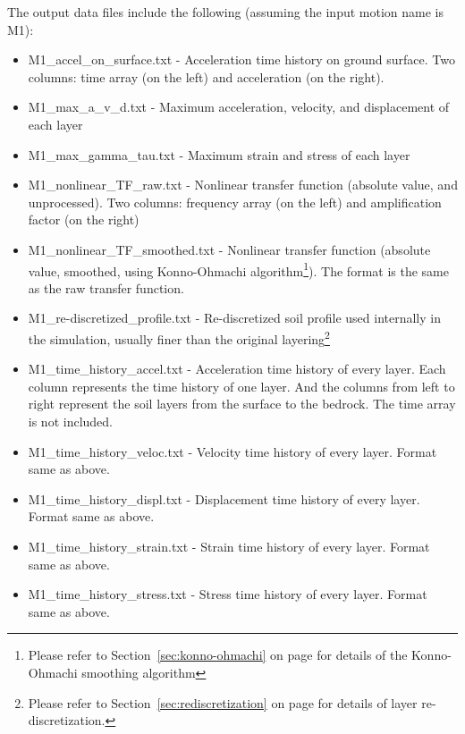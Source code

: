\documentclass[11pt,letterpaper]{article}
\begin{document}
The output data files include the following (assuming the input motion name is M1):

\begin{small}
\begin{itemize}
\item \textsf{M1\_accel\_on\_surface.txt} - Acceleration time history on ground surface. Two columns: time array (on the left) and acceleration (on the right).
\item \textsf{M1\_max\_a\_v\_d.txt} - Maximum acceleration, velocity, and displacement of each layer
\item \textsf{M1\_max\_gamma\_tau.txt} - Maximum strain and stress of each layer
\item \textsf{M1\_nonlinear\_TF\_raw.txt} - Nonlinear transfer function (absolute value, and unprocessed). Two columns: frequency array (on the left) and amplification factor (on the right)
\item \textsf{M1\_nonlinear\_TF\_smoothed.txt} - Nonlinear transfer function (absolute value, smoothed, using Konno-Ohmachi algorithm\footnote{Please refer to Section~\ref{sec:konno-ohmachi} on page \pageref{sec:konno-ohmachi} for details of the Konno-Ohmachi smoothing algorithm}). The format is the same as the raw transfer function.
\item \textsf{M1\_re-discretized\_profile.txt} - Re-discretized soil profile used internally in the simulation, usually finer than the original layering\footnote{Please refer to Section~\ref{sec:rediscretization} on page \pageref{sec:konno-ohmachi} for details of layer re-discretization.}
\item \textsf{M1\_time\_history\_accel.txt} - Acceleration time history of every layer. Each column represents the time history of one layer. And the columns from left to right represent the soil layers from the surface to the bedrock. The time array is not included.
\item \textsf{M1\_time\_history\_veloc.txt} - Velocity time history of every layer. Format same as above.
\item \textsf{M1\_time\_history\_displ.txt} - Displacement time history of every layer. Format same as above.
\item \textsf{M1\_time\_history\_strain.txt} - Strain time history of every layer. Format same as above.
\item \textsf{M1\_time\_history\_stress.txt} - Stress time history of every layer. Format same as above.
\end{itemize}
\end{small}
\end{document}
